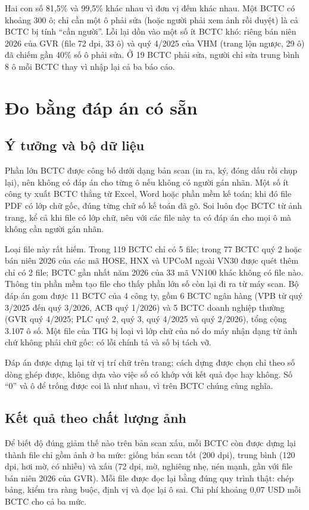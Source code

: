 \documentclass[12pt,a4paper]{report}
\newcommand{\enquote}[1]{“#1”}
\begin{document}
Hai con số 81,5\% và 99,5\% khác nhau vì đơn vị đếm khác nhau. Một BCTC có khoảng 300 ô; chỉ cần một ô phải sửa
(hoặc người phải xem ảnh rồi duyệt) là cả BCTC bị tính \enquote{cần người}. Lỗi lại dồn vào một số ít BCTC khó: riêng
bán niên 2026 của GVR (file 72 dpi, 33 ô) và quý 4/2025 của VHM (trang lộn ngược, 29 ô) đã chiếm gần 40\% số ô phải
sửa. Ở 19 BCTC phải sửa, người chỉ sửa trung bình 8 ô mỗi BCTC thay vì nhập lại cả ba báo cáo.

\section{Đo bằng đáp án có sẵn}\label{sec:dapan}
\subsection{Ý tưởng và bộ dữ liệu}
Phần lớn BCTC được công bố dưới dạng bản scan (in ra, ký, đóng dấu rồi chụp lại), nên không có đáp án cho từng ô nếu
không có người gán nhãn. Một số ít công ty xuất BCTC thẳng từ Excel, Word hoặc phần mềm kế toán; khi đó file PDF có lớp
chữ gốc, đúng từng chữ số kế toán đã gõ. Soi luôn đọc BCTC từ ảnh trang, kể cả khi file có lớp chữ, nên với các file này
ta có đáp án cho mọi ô mà không cần người gán nhãn.

Loại file này rất hiếm. Trong 119 BCTC chỉ có 5 file; trong 77 BCTC quý 2 hoặc bán niên 2026 của các mã HOSE, HNX
và UPCoM ngoài VN30 được quét thêm chỉ có 2 file; BCTC gần nhất năm 2026 của 33 mã VN100 khác không có file nào. Thông tin phần mềm tạo file cho thấy phần lớn số còn lại đi ra từ máy
scan. Bộ đáp án gom được 11 BCTC của 4 công ty, gồm 6 BCTC ngân hàng (VPB từ quý 3/2025 đến quý 3/2026, ACB quý 1/2026)
và 5 BCTC doanh nghiệp thường (GVR quý 4/2025; PLC quý 2, quý 3, quý 4/2025 và quý 2/2026), tổng cộng 3.107 ô số. Một file của TIG bị loại vì
lớp chữ của nó do máy nhận dạng từ ảnh chứ không phải chữ gốc: có lỗi chính tả và số bị tách vỡ.

Đáp án được dựng lại từ vị trí chữ trên trang; cách dựng được chọn chỉ theo số dòng ghép được, không dựa vào việc số có
khớp với kết quả đọc hay không. Số \enquote{0} và ô để trống được coi là như nhau, vì trên BCTC chúng cùng nghĩa.

\subsection{Kết quả theo chất lượng ảnh}
Để biết độ đúng giảm thế nào trên bản scan xấu, mỗi BCTC còn được dựng lại thành file chỉ gồm ảnh ở ba mức: giống bản
scan tốt (200 dpi), trung bình (120 dpi, hơi mờ, có nhiễu) và xấu (72 dpi, mờ, nghiêng nhẹ, nén mạnh, gần với file bán
niên 2026 của GVR). Mỗi file được đọc lại bằng đúng quy trình thật: chép bảng, kiểm tra ràng buộc, định vị và đọc lại ô
sai. Chi phí khoảng 0,07 USD mỗi BCTC cho cả ba mức.
\end{document}
